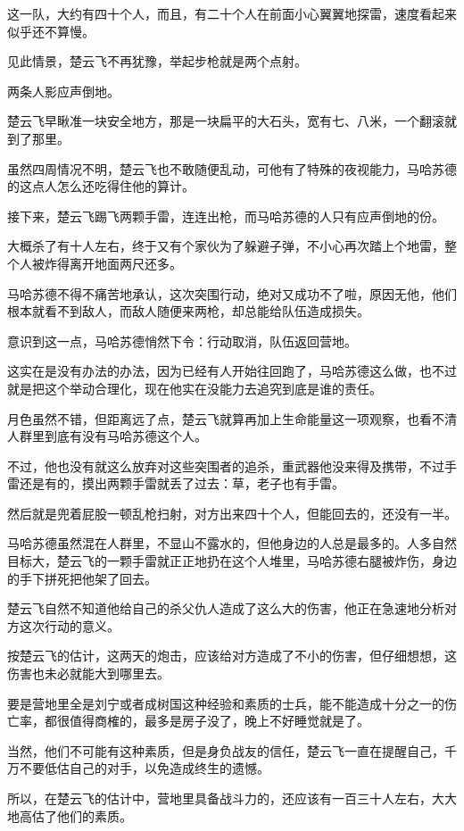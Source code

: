 这一队，大约有四十个人，而且，有二十个人在前面小心翼翼地探雷，速度看起来似乎还不算慢。

见此情景，楚云飞不再犹豫，举起步枪就是两个点射。

两条人影应声倒地。

楚云飞早瞅准一块安全地方，那是一块扁平的大石头，宽有七、八米，一个翻滚就到了那里。

虽然四周情况不明，楚云飞也不敢随便乱动，可他有了特殊的夜视能力，马哈苏德的这点人怎么还吃得住他的算计。

接下来，楚云飞踢飞两颗手雷，连连出枪，而马哈苏德的人只有应声倒地的份。

大概杀了有十人左右，终于又有个家伙为了躲避子弹，不小心再次踏上个地雷，整个人被炸得离开地面两尺还多。

马哈苏德不得不痛苦地承认，这次突围行动，绝对又成功不了啦，原因无他，他们根本就看不到敌人，而敌人随便来两枪，却总能给队伍造成损失。

意识到这一点，马哈苏德悄然下令：行动取消，队伍返回营地。

这实在是没有办法的办法，因为已经有人开始往回跑了，马哈苏德这么做，也不过就是把这个举动合理化，现在他实在没能力去追究到底是谁的责任。

月色虽然不错，但距离远了点，楚云飞就算再加上生命能量这一项观察，也看不清人群里到底有没有马哈苏德这个人。

不过，他也没有就这么放弃对这些突围者的追杀，重武器他没来得及携带，不过手雷还是有的，摸出两颗手雷就丢了过去：草，老子也有手雷。

然后就是兜着屁股一顿乱枪扫射，对方出来四十个人，但能回去的，还没有一半。

马哈苏德虽然混在人群里，不显山不露水的，但他身边的人总是最多的。人多自然目标大，楚云飞的一颗手雷就正正地扔在这个人堆里，马哈苏德右腿被炸伤，身边的手下拼死把他架了回去。

楚云飞自然不知道他给自己的杀父仇人造成了这么大的伤害，他正在急速地分析对方这次行动的意义。

按楚云飞的估计，这两天的炮击，应该给对方造成了不小的伤害，但仔细想想，这伤害也未必就能大到哪里去。

要是营地里全是刘宁或者成树国这种经验和素质的士兵，能不能造成十分之一的伤亡率，都很值得商榷的，最多是房子没了，晚上不好睡觉就是了。

当然，他们不可能有这种素质，但是身负战友的信任，楚云飞一直在提醒自己，千万不要低估自己的对手，以免造成终生的遗憾。

所以，在楚云飞的估计中，营地里具备战斗力的，还应该有一百三十人左右，大大地高估了他们的素质。


